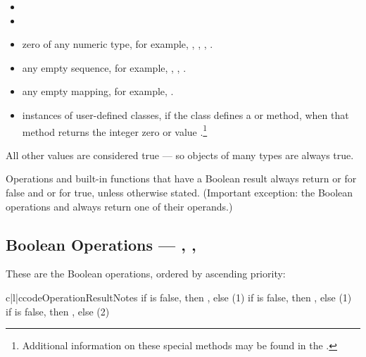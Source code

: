 \begin{itemize}

\item	{}

\item	{}

\item	zero of any numeric type, for example, , ,
        , .

\item	any empty sequence, for example, , \code{()}, \code{[]}.

\item	any empty mapping, for example, \code{\{\}}.

\item	instances of user-defined classes, if the class defines a
         or  method, when that
        method returns the integer zero or  value
        .\footnote{Additional 
information on these special methods may be found in the
.}

\end{itemize}

All other values are considered true --- so objects of many types are
always true.

Operations and built-in functions that have a Boolean result always
return  or  for false and  or 
for true, unless otherwise stated.  (Important exception: the Boolean
operations  and  always
return one of their operands.)

\subsection{Boolean Operations ---
	    , , 
	    \label{boolean}}

These are the Boolean operations, ordered by ascending priority:

\begin{tableiii}{c|l|c}{code}{Operation}{Result}{Notes}
          {if  is false, then , else }{(1)}
          {if  is false, then , else }{(1)}
  \hline
          {if  is false, then , else }{(2)}
\end{tableiii}


